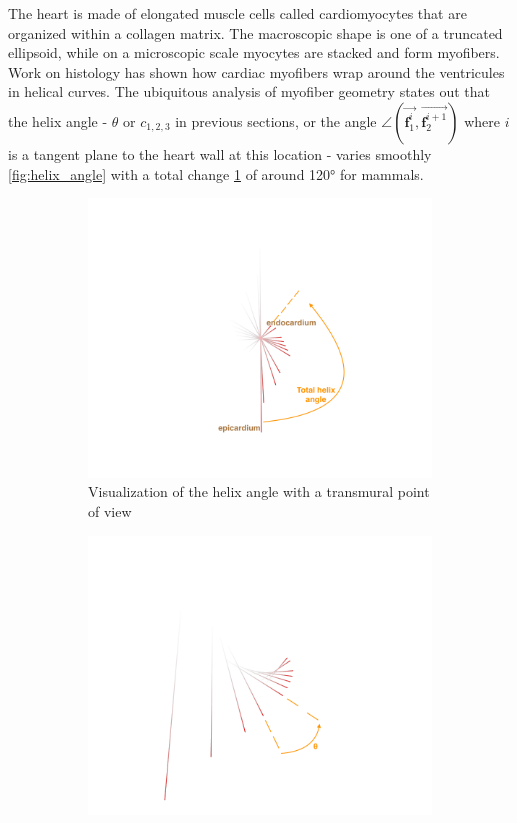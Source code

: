 The heart is made of elongated muscle cells called cardiomyocytes that are organized within a collagen matrix. The macroscopic shape is one of a truncated ellipsoid, while on a microscopic scale myocytes are stacked and form myofibers.\\
Work on histology has shown how cardiac myofibers wrap around the ventricules in helical curves. The ubiquitous analysis of myofiber geometry states out that the helix angle - $\theta$ or $c_{1,2,3}$ in previous sections, or the angle $\angle (\overrightarrow{\mathbf{f}^{i}_1}, \overrightarrow{\mathbf{f}^{i+1}_2})$ where $i$ is a tangent plane to the heart wall at this location - varies smoothly \ref{fig:helix_angle} with a total change \ref{fig:total_angle} of around 120° for mammals.\\
\begin{figure}[!h]
    \centering
    \begin{subfigure}[t]{.48\textwidth}
        \includegraphics[width=\textwidth]{figures/total_angle}
        \caption[b]{Visualization of the helix angle with a transmural point of view}
        \label{fig:total_angle}
    \end{subfigure}
    \begin{subfigure}[t]{.48\textwidth}
        \includegraphics[width=\textwidth]{figures/helix_angle}

\end{subfigure}
\end{figure}
